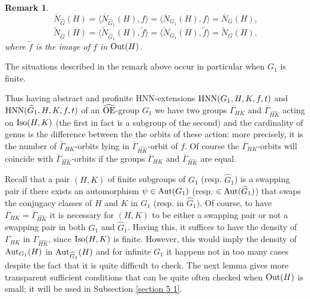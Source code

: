 \documentclass[a4paper,12pt]{article}
\newtheorem{lem}[thm]{Lemma}
\newcommand{\Oe}{\rm \widehat{OE}}
\def\aut {{\rm Aut}}
\def\out {{\rm Out}}
\def\hnn {{\rm HNN}}
\def\Iso {{\rm Iso}}
\newtheorem{rem}[thm]{Remark}
\begin{document}
{\begin{rem}
$$\overline{N}_{\widehat G}(H) = \langle \overline{N}_{\widehat G_1}(H),  f\rangle= \langle \overline{N}_{G_1}(H), f\rangle=\overline{N}_{G}(H),$$ $$\widetilde{N}_{\widehat G}(H) = \langle \widetilde{N}_{\widehat G_1}(H), \tilde f\rangle= \langle \widetilde{N}_{G_1}(H), \tilde f\rangle=\widetilde{N}_{G}(H),$$     
where $\tilde f$ is the image of $f$ in $\out(H)$.
\end{rem}

The situations described in the remark above occur in particular when $G_1$ is finite. 


Thus having abstract and profinite HNN-extensions $\hnn(G_1,H,K,f,t)$  and  $\hnn(\widehat G_1,H,K,f,t)$ of an $\Oe$-group $G_1$ we have two groups $\overline {\Gamma}_{HK}$ and $\overline{\Gamma}_{\widehat{HK}}$ acting on $\Iso(H,K)$ (the first in fact is a subgroup of the second) and the cardinality of genus is the difference between the the orbits of these action: more precisely, it is the number of $\overline {\Gamma}_{HK}$-orbits lying in $\overline{\Gamma}_{\widehat{HK}}$-orbit of $f$.  Of course the $\overline {\Gamma}_{HK}$-orbits will coincide with $\overline{\Gamma}_{\widehat{HK}}$-orbits if the groups $\overline{\Gamma}_{HK}$ and $\overline{\Gamma}_{\widehat{HK}}$ are equal.   


Recall that a pair $(H,K)$ of finite subgroups of $G_1$ (resp. $\widehat G_1$) is a swapping pair if there exists an  automorphism $\psi\in \aut(G_1)$ (resp. $\in \aut(\widehat G_1)$) that swaps the conjugacy classes of $H$ and $K$ in $G_1$ (resp. in $\widehat G_1)$. Of course, to have  $\overline{\Gamma}_{HK}=\overline{\Gamma}_{\widehat{HK}}$ it is necessary for $(H,K)$ to be either a swapping pair or not a swapping pair in both $G_1$ and $\widehat G_1$.  Having this, it suffices to have the density of $\Gamma_{HK}$ in $\Gamma_{\widehat{HK}}$, since $\Iso(H,K)$ is finite. However, this would imply the density of $\aut_{G_1}(H)$  in $\aut_{\widehat G_1}(H)$ and for infinite $G_1$ it happens not in too many cases despite the fact that it is quite difficult to check. The next lemma gives more transparent sufficient conditions that can be quite often checked when $\out(H)$ is small; it  will be used in  Subsection \ref{section 5 1}. 


}
\end{document}
